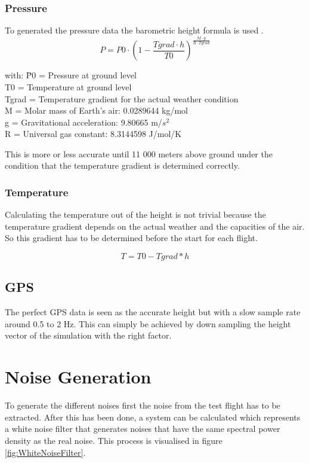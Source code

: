   \subsubsection{Pressure}
  To generated the pressure data the barometric height formula is used \cite{NASAEarthAtmosphereModel2015}.
  $$P = P0 \cdot (1- \frac{Tgrad\cdot h}{T0})^{\frac{M\cdot g}{R\cdot Tgrad}}$$
  \begin{tabbing}
  with: \= P0 = Pressure at ground level \\
  \> T0 = Temperature at ground level \\
  \> Tgrad = Temperature gradient for the actual weather condition \\
  \> M = Molar mass of Earth's air: 0.0289644 kg/mol\\
  \> g = Gravitational acceleration: 9.80665 m/$s^2$\\
  \> R = Universal gas constant: 8.3144598 J/mol/K\\
  \end{tabbing}

  This is more or less accurate until 11 000 meters above ground under the condition that the temperature gradient is determined correctly.

  \subsubsection{Temperature}
  Calculating the temperature out of the height is not trivial because the temperature gradient depends on the actual weather and the capacities of the air.
  So this gradient has to be determined before the start for each flight.

  $$T = T0 - Tgrad*h$$

  \subsection{GPS}
  The perfect GPS data is seen as the accurate height but with a slow sample rate around 0.5 to 2 Hz.
  This can simply be achieved by down sampling the height vector of the simulation with the right factor.

  \section{Noise Generation}
  To generate the different noises first the noise from the test flight has to be extracted.
  After this has been done, a system can be calculated which represents a white noise filter that generates noises
  that have the same spectral power density as the real noise. This process is visualised in figure \ref{fig:WhiteNoiseFilter}.

